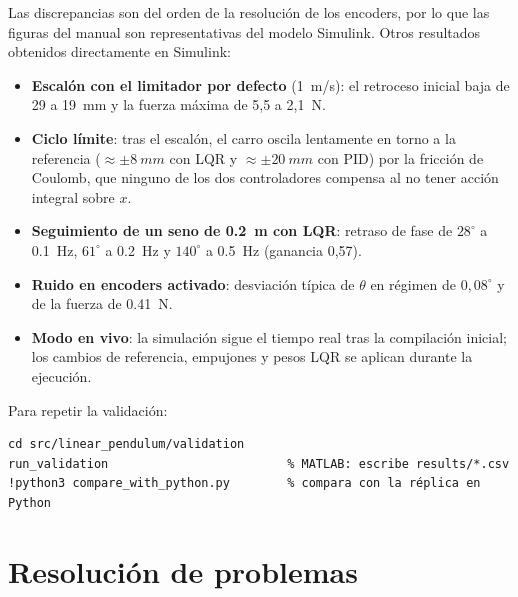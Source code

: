 Las discrepancias son del orden de la resolución de los encoders, por lo que las figuras del manual son representativas del modelo Simulink. Otros resultados obtenidos directamente en Simulink:
\begin{itemize}
  \item \textbf{Escalón con el limitador por defecto} (\SI{1}{m/s}): el retroceso inicial baja de 29 a 19~mm y la fuerza máxima de 5,5 a 2,1~N.
  \item \textbf{Ciclo límite}: tras el escalón, el carro oscila lentamente en torno a la referencia ($\approx\pm\SI{8}{mm}$ con LQR y $\approx\pm\SI{20}{mm}$ con PID) por la fricción de Coulomb, que ninguno de los dos controladores compensa al no tener acción integral sobre $x$.
  \item \textbf{Seguimiento de un seno de \SI{0.2}{m} con LQR}: retraso de fase de $28^\circ$ a \SI{0.1}{Hz}, $61^\circ$ a \SI{0.2}{Hz} y $140^\circ$ a \SI{0.5}{Hz} (ganancia 0,57).
  \item \textbf{Ruido en encoders activado}: desviación típica de $\theta$ en régimen de $0{,}08^\circ$ y de la fuerza de \SI{0.41}{N}.
  \item \textbf{Modo en vivo}: la simulación sigue el tiempo real tras la compilación inicial; los cambios de referencia, empujones y pesos LQR se aplican durante la ejecución.
\end{itemize}

Para repetir la validación:
\begin{lstlisting}
cd src/linear_pendulum/validation
run_validation                         % MATLAB: escribe results/*.csv
!python3 compare_with_python.py        % compara con la réplica en Python
\end{lstlisting}

\chapter{Resolución de problemas}

